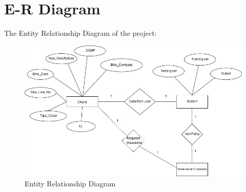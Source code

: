 \section{E-R Diagram}
The Entity Relationship Diagram of the project:
\par
\begin{figure}[tbh] %
\begin{large}

	\includegraphics[width=6in]{images/ER.jpg}
	\caption{Entity Relationship Diagram} %
	\label{ER} %
\end{large}
\end{figure}
\newpage
